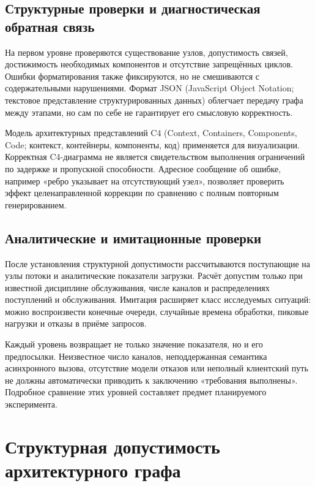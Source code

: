 \subsection{Структурные проверки и диагностическая обратная связь}

На первом уровне проверяются существование узлов, допустимость связей, достижимость необходимых компонентов и отсутствие запрещённых циклов. Ошибки форматирования также фиксируются, но не смешиваются с содержательными нарушениями. Формат JSON (JavaScript Object Notation; текстовое представление структурированных данных) облегчает передачу графа между этапами, но сам по себе не гарантирует его смысловую корректность.

Модель архитектурных представлений C4 (Context, Containers, Components, Code; контекст, контейнеры, компоненты, код) применяется для визуализации. Корректная C4-диаграмма не является свидетельством выполнения ограничений по задержке и пропускной способности. Адресное сообщение об ошибке, например «ребро указывает на отсутствующий узел», позволяет проверить эффект целенаправленной коррекции по сравнению с полным повторным генерированием.

\subsection{Аналитические и имитационные проверки}

После установления структурной допустимости рассчитываются поступающие на узлы потоки и аналитические показатели загрузки. Расчёт допустим только при известной дисциплине обслуживания, числе каналов и распределениях поступлений и обслуживания. Имитация расширяет класс исследуемых ситуаций: можно воспроизвести конечные очереди, случайные времена обработки, пиковые нагрузки и отказы в приёме запросов.

Каждый уровень возвращает не только значение показателя, но и его предпосылки. Неизвестное число каналов, неподдержанная семантика асинхронного вызова, отсутствие модели отказов или неполный клиентский путь не должны автоматически приводить к заключению «требования выполнены». Подробное сравнение этих уровней составляет предмет планируемого эксперимента.


\section{Структурная допустимость архитектурного графа}

